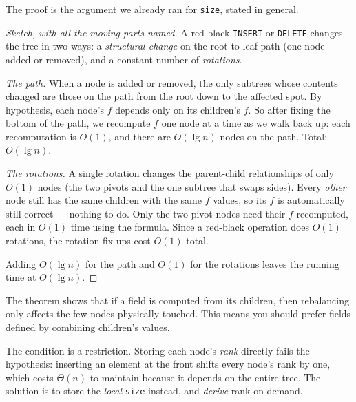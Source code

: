 The proof is the argument we already ran for \texttt{size}, stated in
general.

\begin{proof}[Sketch, with all the moving parts named]
A red-black \texttt{INSERT} or \texttt{DELETE} changes the tree in two ways: a
\emph{structural change} on the root-to-leaf path (one node added or removed),
and a constant number of \emph{rotations}.

\emph{The path.} When a node is added or removed, the only subtrees whose
contents changed are those on the path from the root down to the affected spot.
By hypothesis, each node's $f$ depends only on its children's $f$. So after
fixing the bottom of the path, we recompute $f$ one node at a time as we walk
back up: each recomputation is $O(1)$, and there are $O(\lg n)$ nodes on the
path. Total: $O(\lg n)$.

\emph{The rotations.} A single rotation changes the parent-child relationships of
only $O(1)$ nodes (the two pivots and the one subtree that swaps sides). Every
\emph{other} node still has the same children with the same $f$ values, so its
$f$ is automatically still correct --- nothing to do. Only the two pivot nodes
need their $f$ recomputed, each in $O(1)$ time using the formula. Since a
red-black operation does $O(1)$ rotations, the rotation fix-ups cost $O(1)$
total.

Adding $O(\lg n)$ for the path and $O(1)$ for the rotations leaves the running
time at $O(\lg n)$. \qedhere
\end{proof}

\begin{intuitionbox}
The theorem shows that if a field is computed from its children, then rebalancing
only affects the few nodes physically touched. This means you should prefer fields
defined by combining children's values.
\end{intuitionbox}

\begin{trapbox}
The condition is a restriction. Storing each node's \emph{rank} directly fails the
hypothesis: inserting an element at the front shifts every node's rank by one,
which costs $\Theta(n)$ to maintain because it depends on the entire tree. The solution
is to store the \emph{local} \texttt{size} instead, and \emph{derive} rank on demand.
\end{trapbox}

